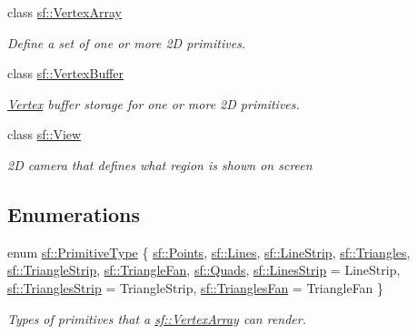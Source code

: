 \begin{DoxyCompactItemize}
class \mbox{\hyperlink{classsf_1_1_vertex_array}{sf\+::\+Vertex\+Array}}
\begin{DoxyCompactList}\small\item\em Define a set of one or more 2D primitives. \end{DoxyCompactList}\item 
class \mbox{\hyperlink{classsf_1_1_vertex_buffer}{sf\+::\+Vertex\+Buffer}}
\begin{DoxyCompactList}\small\item\em \mbox{\hyperlink{classsf_1_1_vertex}{Vertex}} buffer storage for one or more 2D primitives. \end{DoxyCompactList}\item 
class \mbox{\hyperlink{classsf_1_1_view}{sf\+::\+View}}
\begin{DoxyCompactList}\small\item\em 2D camera that defines what region is shown on screen \end{DoxyCompactList}\end{DoxyCompactItemize}
\subsection*{Enumerations}
\begin{DoxyCompactItemize}
\item 
enum \mbox{\hyperlink{group__graphics_ga5ee56ac1339984909610713096283b1b}{sf\+::\+Primitive\+Type}} \{ \newline
\mbox{\hyperlink{group__graphics_gga5ee56ac1339984909610713096283b1bac7097d3e01778b9318def1f7ac35a785}{sf\+::\+Points}}, 
\mbox{\hyperlink{group__graphics_gga5ee56ac1339984909610713096283b1ba2bf015eeff9f798dfc3d6d744d669f1e}{sf\+::\+Lines}}, 
\mbox{\hyperlink{group__graphics_gga5ee56ac1339984909610713096283b1ba14d9eeec2c7c314f239a57bde35949fa}{sf\+::\+Line\+Strip}}, 
\mbox{\hyperlink{group__graphics_gga5ee56ac1339984909610713096283b1ba880a7aa72c20b9f9beb7eb64d2434670}{sf\+::\+Triangles}}, 
\newline
\mbox{\hyperlink{group__graphics_gga5ee56ac1339984909610713096283b1ba05e55fec6d32c2fc8328f94d07f91184}{sf\+::\+Triangle\+Strip}}, 
\mbox{\hyperlink{group__graphics_gga5ee56ac1339984909610713096283b1ba363f7762b33706c805c6a451ad554f5e}{sf\+::\+Triangle\+Fan}}, 
\mbox{\hyperlink{group__graphics_gga5ee56ac1339984909610713096283b1ba5041359b76b4bd3d3e6ef738826b8743}{sf\+::\+Quads}}, 
\mbox{\hyperlink{group__graphics_gga5ee56ac1339984909610713096283b1ba5b09910f5d0f39641342184ccd0d1de3}{sf\+::\+Lines\+Strip}} = Line\+Strip, 
\newline
\mbox{\hyperlink{group__graphics_gga5ee56ac1339984909610713096283b1ba66643dbbb24bbacb405973ed80eebae0}{sf\+::\+Triangles\+Strip}} = Triangle\+Strip, 
\mbox{\hyperlink{group__graphics_gga5ee56ac1339984909610713096283b1ba5338a2c6d922151fe50f235036af8a20}{sf\+::\+Triangles\+Fan}} = Triangle\+Fan
 \}
\begin{DoxyCompactList}\small\item\em Types of primitives that a \mbox{\hyperlink{classsf_1_1_vertex_array}{sf\+::\+Vertex\+Array}} can render. \end{DoxyCompactList}\end{DoxyCompactItemize}


